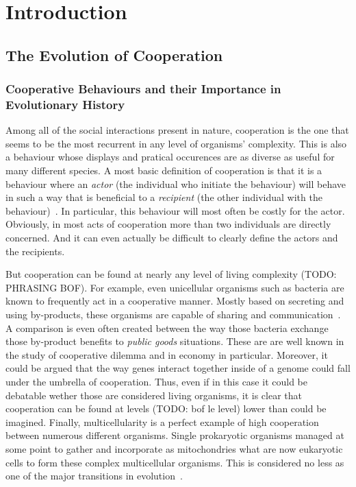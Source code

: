 \chapter{Introduction}

\minitoc[n] %

\section{The Evolution of Cooperation}

  \subsection{Cooperative Behaviours and their Importance in Evolutionary History}

    Among all of the social interactions present in nature, cooperation is the one that seems to be the most recurrent in any level of organisms' complexity. This is also a behaviour whose displays and pratical occurences are as diverse as useful for many different species. A most basic definition of cooperation is that it is a behaviour where an \emph{actor} (the individual who initiate the behaviour) will behave in such a way that is beneficial to a \emph{recipient} (the other individual with the behaviour)~\cite{West2006}. In particular, this behaviour will most often be costly for the actor. Obviously, in most acts of cooperation more than two individuals are directly concerned. And it can even actually be difficult to clearly define the actors and the recipients.

    But cooperation can be found at nearly any level of living complexity (TODO: PHRASING BOF). For example, even unicellular organisms such as bacteria are known to frequently act in a cooperative manner. Mostly based on secreting and using by-products, these organisms are capable of sharing and communication~\cite{West2006b}. A comparison is even often created between the way those bacteria exchange those by-product benefits to \emph{public goods} situations. These are are well known in the study of cooperative dilemma and in economy in particular. Moreover, it could be argued that the way genes interact together inside of a genome could fall under the umbrella of cooperation. Thus, even if in this case it could be debatable wether those are considered living organisms, it is clear that cooperation can be found at levels (TODO: bof le level) lower than could be imagined. Finally, multicellularity is a perfect example of high cooperation between numerous different organisms. Single prokaryotic organisms managed at some point to gather and incorporate as mitochondries what are now eukaryotic cells to form these complex multicellular organisms. This is considered no less as one of the major transitions in evolution~\cite{Szathmary1995}.


